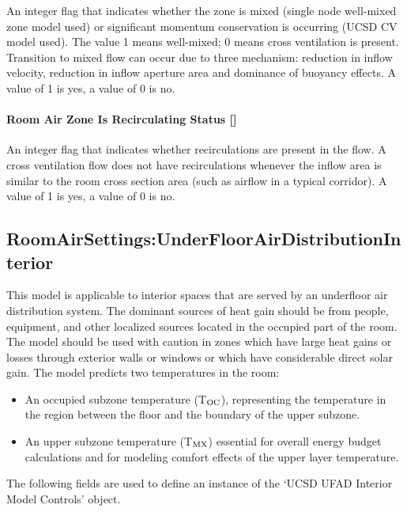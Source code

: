 An integer flag that indicates whether the zone is mixed (single node well-mixed zone model used) or significant momentum conservation is occurring (UCSD CV model used). The value 1 means well-mixed; 0 means cross ventilation is present. Transition to mixed flow can occur due to three mechanism: reduction in inflow velocity, reduction in inflow aperture area and dominance of buoyancy effects. A value of 1 is yes, a value of 0 is no.

\paragraph{Room Air Zone Is Recirculating Status {[]}}\label{room-air-zone-is-recirculating-status}

An integer flag that indicates whether recirculations are present in the flow. A cross ventilation flow does not have recirculations whenever the inflow area is similar to the room cross section area (such as airflow in a typical corridor). A value of 1 is yes, a value of 0 is no.

\subsection{RoomAirSettings:UnderFloorAirDistributionInterior}\label{roomairsettingsunderfloorairdistributioninterior}

This model is applicable to interior spaces that are served by an underfloor air distribution system. The dominant sources of heat gain should be from people, equipment, and other localized sources located in the occupied part of the room. The model should be used with caution in zones which have large heat gains or losses through exterior walls or windows or which have considerable direct solar gain. The model predicts two temperatures in the room:

\begin{itemize}
\item
  An occupied subzone temperature (T\(_{\rm{OC}}\)), representing the temperature in the region between the floor and the boundary of the upper subzone.
\item
  An upper subzone temperature (T\(_{\rm{MX}}\)) essential for overall energy budget calculations and for modeling comfort effects of the upper layer temperature.
\end{itemize}

The following fields are used to define an instance of the `UCSD UFAD Interior Model Controls' object.

